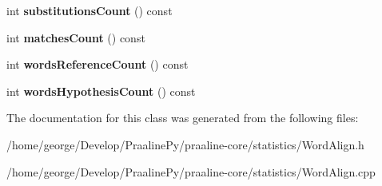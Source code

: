 \begin{DoxyCompactItemize}
int {\bfseries substitutions\+Count} () const
\item 
\mbox{\label{class_word_align_ac33f0e1daf76a7a61f372b137b9b9db9}} 
int {\bfseries matches\+Count} () const
\item 
\mbox{\label{class_word_align_af3fdcd0cc3080d7db8079f9928556106}} 
int {\bfseries words\+Reference\+Count} () const
\item 
\mbox{\label{class_word_align_a79fbf7e604cb84d7ec03c0ef2a54b50d}} 
int {\bfseries words\+Hypothesis\+Count} () const
\end{DoxyCompactItemize}


The documentation for this class was generated from the following files\+:\begin{DoxyCompactItemize}
\item 
/home/george/\+Develop/\+Praaline\+Py/praaline-\/core/statistics/Word\+Align.\+h\item 
/home/george/\+Develop/\+Praaline\+Py/praaline-\/core/statistics/Word\+Align.\+cpp\end{DoxyCompactItemize}

